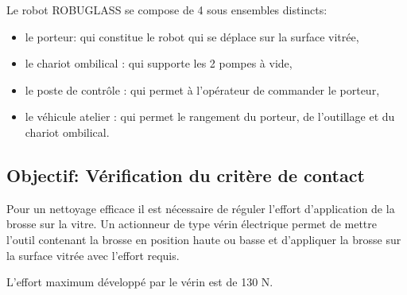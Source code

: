 Le robot ROBUGLASS se compose de 4 sous ensembles distincts: 
\begin{itemize}
 \item le porteur: qui constitue le robot qui se déplace sur la surface vitrée,
 \item le chariot ombilical : qui supporte les 2 pompes à vide,
 \item le poste de contrôle : qui permet à l'opérateur de commander le porteur,
 \item le véhicule atelier : qui permet le rangement du porteur, de l'outillage et du chariot 
ombilical.
\end{itemize}

\subsection{Objectif: Vérification du critère de contact}
 
Pour un nettoyage efficace il est nécessaire de réguler l'effort d'application de la brosse sur la vitre. Un actionneur de type vérin électrique permet de mettre l'outil contenant la brosse en position haute ou basse et d'appliquer la brosse sur la surface vitrée avec l'effort requis.

L'effort maximum développé par le vérin est de 130 N. 



